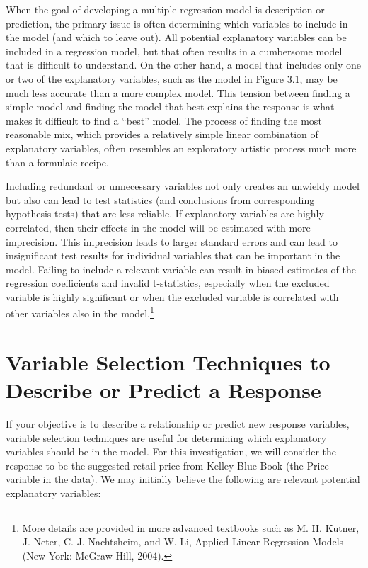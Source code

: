 \documentclass[
]{report}
\begin{document}
When the goal of developing a multiple regression model is description or prediction, the primary issue is often determining which variables to include in the model (and which to leave out). All potential explanatory variables can be included in a regression model, but that often results in a cumbersome model that is difficult to understand. On the other hand, a model that includes only one or two of the explanatory variables, such as the model in Figure 3.1, may be much less accurate than a more complex model. This tension between finding a simple model and finding the model that best explains the response is what makes it difficult to find a ``best'' model. The process of finding the most reasonable mix, which provides a relatively simple linear combination of explanatory variables, often resembles an exploratory artistic process much more than a formulaic recipe.

Including redundant or unnecessary variables not only creates an unwieldy model but also can lead to test statistics (and conclusions from corresponding hypothesis tests) that are less reliable. If explanatory variables are highly correlated, then their effects in the model will be estimated with more imprecision. This imprecision leads to larger standard errors and can lead to insignificant test results for individual variables that can be important in the model. Failing to include a relevant variable can result in biased estimates of the regression coefficients and invalid t-statistics, especially when the excluded variable is highly significant or when the excluded variable is correlated with other variables also in the model.\footnote{More details are provided in more advanced textbooks such as M. H. Kutner, J. Neter, C. J. Nachtsheim, and W. Li, Applied Linear Regression Models (New York: McGraw-Hill, 2004).}

\hypertarget{variable-selection-techniques-to-describe-or-predict-a-response}{%
\section{\texorpdfstring{\textbf{Variable Selection Techniques to Describe or Predict a Response}}{Variable Selection Techniques to Describe or Predict a Response}}\label{variable-selection-techniques-to-describe-or-predict-a-response}}

If your objective is to describe a relationship or predict new response variables, variable selection techniques are useful for determining which explanatory variables should be in the model. For this investigation, we will consider the response to be the suggested retail price from Kelley Blue Book (the Price variable in the data). We may initially believe the following are relevant potential explanatory variables:
\end{document}
